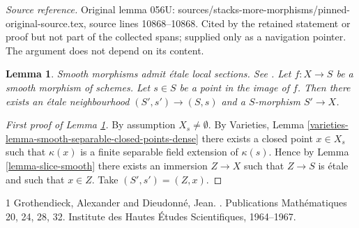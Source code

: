 \documentclass[10pt,a4paper]{amsart}
\theoremstyle{plain}
\newtheorem{lemma}[subsection]{Lemma}
\theoremstyle{definition}
\theoremstyle{remark}
\numberwithin{equation}{subsection}
\newenvironment{reference}{}{}
\newenvironment{slogan}{}{}
\begin{document}
\noindent\textit{Source reference.} Original lemma 056U: sources/stacks-more-morphisms/pinned-original-source.tex, source lines 10868--10868. Cited by the retained statement or proof but not part of the collected spans; supplied only as a navigation pointer. The argument does not depend on its content.\par\medskip
\begin{lemma}
\label{lemma-etale-nbhd-dominates-smooth}
\begin{slogan}
Smooth morphisms admit \'etale local sections.
\end{slogan}
\begin{reference}
See \cite[Corollaire 17.16.3 (ii)]{EGA4}.
\end{reference}
Let $f : X \to S$ be a smooth morphism of schemes.
Let $s \in S$ be a point in the image of $f$.
Then there exists an \'etale neighbourhood $(S', s') \to (S, s)$
and a $S$-morphism $S' \to X$.
\end{lemma}

\begin{proof}[First proof of Lemma \ref{lemma-etale-nbhd-dominates-smooth}]
By assumption $X_s \not = \emptyset$. By
Varieties, Lemma \ref{varieties-lemma-smooth-separable-closed-points-dense}
there exists a closed point $x \in X_s$ such that $\kappa(x)$
is a finite separable field extension of $\kappa(s)$.
Hence by
Lemma \ref{lemma-slice-smooth}
there exists an immersion $Z \to X$ such that $Z \to S$ is \'etale and such
that $x \in Z$. Take $(S' , s') = (Z, x)$.
\end{proof}

\begin{thebibliography}{1}
Grothendieck, Alexander and Dieudonn{\'e}, Jean.
.
\newblock Publications {M}ath{\'e}matiques 20, 24, 28, 32. Institute des {H}autes {\'E}tudes {S}cientifiques, 1964--1967.
\end{thebibliography}
\end{document}
